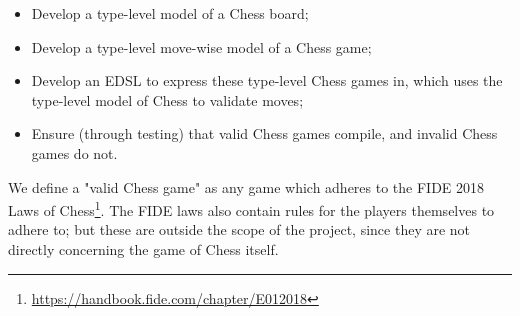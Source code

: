 \begin{itemize}
    \item Develop a type-level model of a Chess board;
    \item Develop a type-level move-wise model of a Chess game;
    \item Develop an EDSL to express these type-level Chess games in, which uses the type-level model of Chess to validate moves;
    \item Ensure (through testing) that valid Chess games compile, and invalid Chess games do not.
\end{itemize}

We define a "valid Chess game" as any game which adheres to the FIDE 2018 Laws of Chess\footnote{\url{https://handbook.fide.com/chapter/E012018}}. The FIDE laws also contain rules for the players themselves to adhere to; but these are outside the scope of the project, since they are not directly concerning the game of Chess itself.
